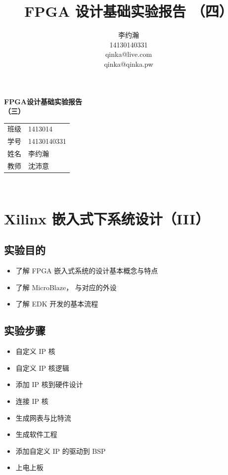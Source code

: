\documentclass{ctexart}
\author{李约瀚 \\ 14130140331 \\ qinka@live.com \\ qinka@qinka.pw}
\title{FPGA 设计基础实验报告 （四）}
\begin{document}
\thispagestyle{empty}
\begin{center}
  \vspace*{4em}
  {\Huge\textbf{FPGA设计基础实验报告\\\vspace*{0.5em} （三）}}
  \vfill
  \large
  \begin{tabular}{c@{：}l}
    班级 & 1413014 \\
    学号 & 14130140331 \\ 
    姓名 & 李约瀚 \\ 
    教师 & 沈沛意 \\
  \end{tabular} 
  \vspace*{4em}\\
\end{center}
\newpage

\setcounter{page}{0}
\setcounter{section}{0}


\section{Xilinx 嵌入式下系统设计（III）}
        
\subsection{实验目的}
\begin{itemize}
\item 了解 FPGA 嵌入式系统的设计基本概念与特点
\item 了解 MicroBlaze， 与对应的外设
\item 了解 EDK 开发的基本流程
\end{itemize}

\subsection{实验步骤}

\begin{itemize}
\item 自定义 IP 核
\item 自定义 IP 核逻辑
\item 添加 IP 核到硬件设计
\item 连接 IP 核
\item 生成网表与比特流
\item 生成软件工程
\item 添加自定义 IP 的驱动到 BSP
\item 上电上板
\end{itemize}
\end{document}
